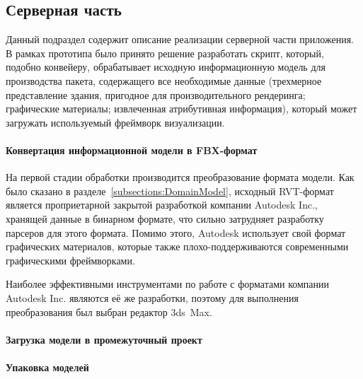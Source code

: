 ﻿\subsection{Серверная часть}
\label{subsections:ServerImpl}

Данный подраздел содержит описание реализации серверной части приложения.
В рамках прототипа было принято решение разработать скрипт,
который, подобно конвейеру, обрабатывает исходную информационную модель
для производства пакета, содержащего все необходимые данные
(трехмерное представление здания, пригодное для производительного рендеринга;
графические материалы; извлеченная атрибутивная информация),
который может загружать используемый фреймворк визуализации.

\paragraph{Конвертация информационной модели в FBX-формат}

На первой стадии обработки производится преобразование формата модели.
Как было сказано в разделе~\ref{subsections:DomainModel},
исходный RVT-формат является проприетарной закрытой разработкой
компании Autodesk Inc., хранящей данные в бинарном формате,
что сильно затрудняет разработку парсеров для этого формата.
Помимо этого, Autodesk использует свой формат графических материалов,
которые также плохо-поддерживаются современными графическими фреймворками.

Наиболее эффективными инструментами по работе с форматами
ком\-па\-нии Auto\-desk Inc. являются её же разработки,
поэтому для выполнения преобразования был выбран редактор 3ds~Max.

\paragraph{Загрузка модели в промежуточный проект}


\paragraph{Упаковка моделей}


